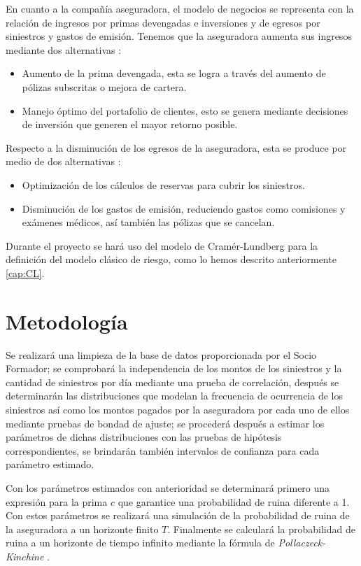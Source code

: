 \documentclass[journal]{IEEEtran}
\begin{document}
        En cuanto a la compañía aseguradora, el modelo de negocios se representa con la relación de ingresos por primas devengadas e inversiones y de egresos por siniestros y gastos de emisión. Tenemos que la aseguradora aumenta sus ingresos mediante dos alternativas \cite{aseguradora}:
        \begin{itemize}
            \item Aumento de la prima devengada, esta se logra a través del aumento de pólizas  subscritas o mejora de cartera.
            \item Manejo óptimo del portafolio de clientes, esto se genera mediante decisiones de inversión que generen el mayor retorno posible.
        \end{itemize}
        
        Respecto a la disminución de los egresos de la aseguradora, esta se produce por medio de dos alternativas \cite{aseguradora}:
        \begin{itemize}
            \item Optimización de los cálculos de reservas para cubrir los siniestros.
            \item Disminución de los gastos de emisión, reduciendo gastos como comisiones y exámenes médicos, así también las pólizas que se cancelan.
        \end{itemize}
        
        Durante el proyecto se hará uso del modelo de Cramér-Lundberg para la definición del modelo clásico de riesgo, como lo hemos descrito anteriormente \ref{cap:CL}.
        
    \section{Metodología} \label{sec:method}

        Se realizará una limpieza de la base de datos proporcionada por el Socio Formador; se comprobará la independencia de los montos de los siniestros y la cantidad de siniestros por día mediante una prueba de correlación, después se determinarán las distribuciones que modelan la frecuencia de ocurrencia de los siniestros así como los montos pagados por la aseguradora por cada uno de ellos mediante pruebas de bondad de ajuste; se procederá después a estimar los parámetros de dichas distribuciones con las pruebas de hipótesis correspondientes, se brindarán también intervalos de confianza para cada parámetro estimado.

        Con los parámetros estimados con anterioridad se determinará primero una expresión para la prima $c$ que garantice una probabilidad de ruina diferente a 1. Con estos parámetros se realizará una simulación de la probabilidad de ruina de la aseguradora a un horizonte finito $T$. Finalmente se calculará la probabilidad de ruina a un horizonte de tiempo infinito mediante la fórmula de \emph{Pollaczeck-Kinchine} \cite{josafat-santana-2020}.
    
\end{document}
